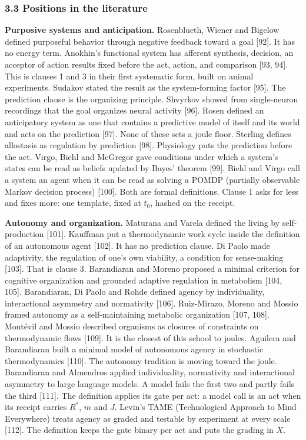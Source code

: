 \documentclass[
  10pt,
]{article}
\begin{document}
\subsubsection{3.3 Positions in the
literature}\label{positions-in-the-literature}

\textbf{Purposive systems and anticipation.} Rosenblueth, Wiener and
Bigelow defined purposeful behavior through negative feedback toward a
goal {[}92{]}. It has no energy term. Anokhin's functional system has
afferent synthesis, decision, an acceptor of action results fixed before
the act, action, and comparison {[}93, 94{]}. This is clauses 1 and 3 in
their first systematic form, built on animal experiments. Sudakov stated
the result as the system-forming factor {[}95{]}. The prediction clause
is the organizing principle. Shvyrkov showed from single-neuron
recordings that the goal organizes neural activity {[}96{]}. Rosen
defined an anticipatory system as one that contains a predictive model
of itself and its world and acts on the prediction {[}97{]}. None of
these sets a joule floor. Sterling defines allostasis as regulation by
prediction {[}98{]}. Physiology puts the prediction before the act.
Virgo, Biehl and McGregor gave conditions under which a system's states
can be read as beliefs updated by Bayes' theorem {[}99{]}. Biehl and
Virgo call a system an agent when it can be read as solving a POMDP
(partially observable Markov decision process) {[}100{]}. Both are
formal definitions. Clause 1 asks for less and fixes more: one template,
fixed at \(t_0\), hashed on the receipt.

\textbf{Autonomy and organization.} Maturana and Varela defined the
living by self-production {[}101{]}. Kauffman put a thermodynamic work
cycle inside the definition of an autonomous agent {[}102{]}. It has no
prediction clause. Di Paolo made adaptivity, the regulation of one's own
viability, a condition for sense-making {[}103{]}. That is clause 3.
Barandiaran and Moreno proposed a minimal criterion for cognitive
organization and grounded adaptive regulation in metabolism {[}104,
105{]}. Barandiaran, Di Paolo and Rohde defined agency by individuality,
interactional asymmetry and normativity {[}106{]}. Ruiz-Mirazo, Moreno
and Mossio framed autonomy as a self-maintaining metabolic organization
{[}107, 108{]}. Montévil and Mossio described organisms as closures of
constraints on thermodynamic flows {[}109{]}. It is the closest of this
school to joules. Aguilera and Barandiaran built a minimal model of
autonomous agency in stochastic thermodynamics {[}110{]}. The autonomy
tradition is moving toward the joule. Barandiaran and Almendros applied
individuality, normativity and interactional asymmetry to large language
models. A model fails the first two and partly fails the third
{[}111{]}. The definition applies its gate per act: a model call is an
act when its receipt carries \(R^*\), \(m\) and \(J\). Levin's TAME
(Technological Approach to Mind Everywhere) treats agency as graded and
testable by experiment at every scale {[}112{]}. The definition keeps
the gate binary per act and puts the grading in \(X\).
\end{document}
